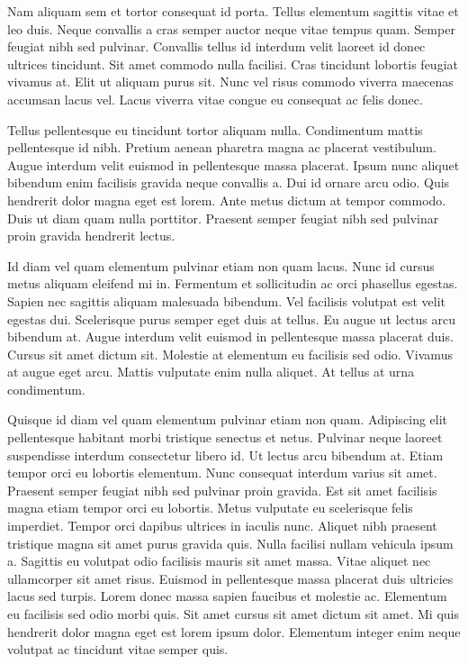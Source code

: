 \documentclass[11pt,a4paper]{article}
\begin{document}
Nam aliquam sem et tortor consequat id porta. Tellus elementum sagittis vitae et leo duis. Neque convallis a cras semper auctor neque vitae tempus quam. Semper feugiat nibh sed pulvinar. Convallis tellus id interdum velit laoreet id donec ultrices tincidunt. Sit amet commodo nulla facilisi. Cras tincidunt lobortis feugiat vivamus at. Elit ut aliquam purus sit. Nunc vel risus commodo viverra maecenas accumsan lacus vel. Lacus viverra vitae congue eu consequat ac felis donec.

Tellus pellentesque eu tincidunt tortor aliquam nulla. Condimentum mattis pellentesque id nibh. Pretium aenean pharetra magna ac placerat vestibulum. Augue interdum velit euismod in pellentesque massa placerat. Ipsum nunc aliquet bibendum enim facilisis gravida neque convallis a. Dui id ornare arcu odio. Quis hendrerit dolor magna eget est lorem. Ante metus dictum at tempor commodo. Duis ut diam quam nulla porttitor. Praesent semper feugiat nibh sed pulvinar proin gravida hendrerit lectus.

Id diam vel quam elementum pulvinar etiam non quam lacus. Nunc id cursus metus aliquam eleifend mi in. Fermentum et sollicitudin ac orci phasellus egestas. Sapien nec sagittis aliquam malesuada bibendum. Vel facilisis volutpat est velit egestas dui. Scelerisque purus semper eget duis at tellus. Eu augue ut lectus arcu bibendum at. Augue interdum velit euismod in pellentesque massa placerat duis. Cursus sit amet dictum sit. Molestie at elementum eu facilisis sed odio. Vivamus at augue eget arcu. Mattis vulputate enim nulla aliquet. At tellus at urna condimentum.

Quisque id diam vel quam elementum pulvinar etiam non quam. Adipiscing elit pellentesque habitant morbi tristique senectus et netus. Pulvinar neque laoreet suspendisse interdum consectetur libero id. Ut lectus arcu bibendum at. Etiam tempor orci eu lobortis elementum. Nunc consequat interdum varius sit amet. Praesent semper feugiat nibh sed pulvinar proin gravida. Est sit amet facilisis magna etiam tempor orci eu lobortis. Metus vulputate eu scelerisque felis imperdiet. Tempor orci dapibus ultrices in iaculis nunc. Aliquet nibh praesent tristique magna sit amet purus gravida quis. Nulla facilisi nullam vehicula ipsum a. Sagittis eu volutpat odio facilisis mauris sit amet massa. Vitae aliquet nec ullamcorper sit amet risus. Euismod in pellentesque massa placerat duis ultricies lacus sed turpis. Lorem donec massa sapien faucibus et molestie ac. Elementum eu facilisis sed odio morbi quis. Sit amet cursus sit amet dictum sit amet. Mi quis hendrerit dolor magna eget est lorem ipsum dolor. Elementum integer enim neque volutpat ac tincidunt vitae semper quis.
\end{document}
